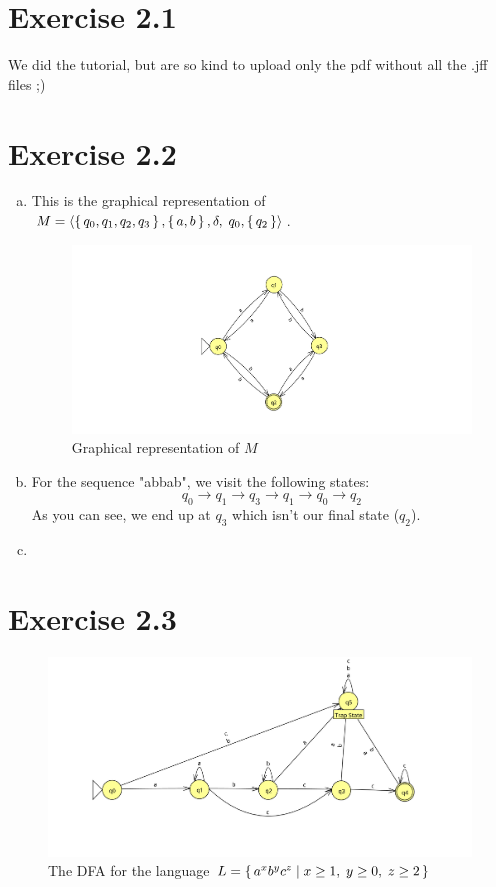 \documentclass{article} %
\newcommand{\homeworkNumber}{2}
\begin{document}
\section*{Exercise \homeworkNumber.1}
We did the tutorial, but are so kind to upload only the pdf without all the
.jff files ;)

\section*{Exercise \homeworkNumber.2}
\begin{enumerate}[(a)]
	\item
	This is the graphical representation of $M = \left \langle
		\set{q_0, q_1, q_2, q_3}, \set{a, b}, \delta,\; q_0, \set{q_2}
		\right \rangle$.
	\begin{figure}[H]
		\includegraphics[width=\linewidth]{ex2a.png}
		\centering
		\caption{Graphical representation of $M$}
	\end{figure}

	\item
	For the sequence "abbab", we visit the following states:
	$$
	q_0 \to q_1 \to q_3 \to q_1 \to q_0 \to q_2
	$$
	As you can see, we end up at $q_3$ which isn't our final state ($q_2$).

	\item

\end{enumerate}

\clearpage

\section*{Exercise \homeworkNumber.3}
\begin{figure}[H]
	\includegraphics[width=\linewidth]{ex3.png}
	\centering
	\caption{The DFA for the language $L = \set{a^x b^y c^z \mid x \ge 1,\; y \ge 0,\; z \ge 2}$}
\end{figure}
\end{document}
